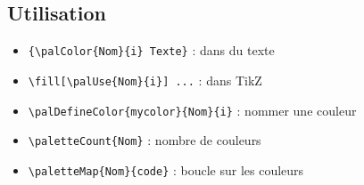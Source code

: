 \documentclass{article}
\begin{document}
\subsection*{Utilisation}
\begin{itemize}
\item \texttt{\{\textbackslash palColor\{Nom\}\{i\} Texte\}} : dans du texte
\item \texttt{\textbackslash fill[\textbackslash palUse\{Nom\}\{i\}] ...} : dans TikZ
\item \texttt{\textbackslash palDefineColor\{mycolor\}\{Nom\}\{i\}} : nommer une couleur
\item \texttt{\textbackslash paletteCount\{Nom\}} : nombre de couleurs
\item \texttt{\textbackslash paletteMap\{Nom\}\{code\}} : boucle sur les couleurs
\end{itemize}
\end{document}
